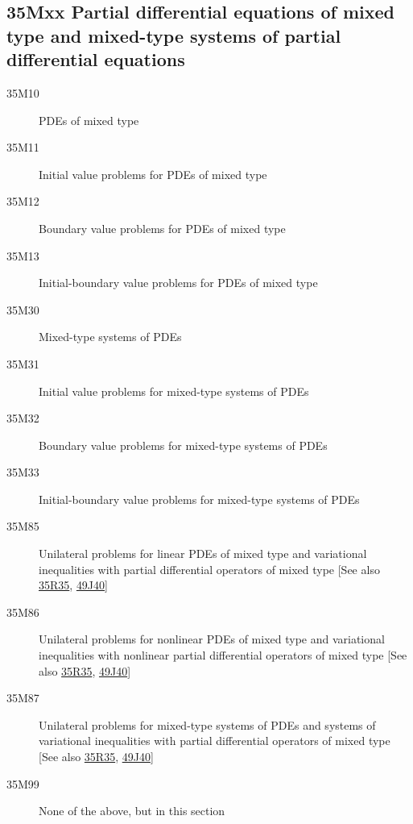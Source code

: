 \documentclass[letterpaper]{article}
\begin{document}
\subsection*{35Mxx Partial differential equations of mixed type  and mixed-type systems of partial differential equations}\label{35Mxx}
\begin{description}  
\item [35M10]\label{35M10} PDEs of mixed type
\item [35M11]\label{35M11} Initial value problems for PDEs of mixed type
\item [35M12]\label{35M12} Boundary value problems for PDEs of mixed type
\item [35M13]\label{35M13} Initial-boundary value problems for PDEs of mixed type
\item [35M30]\label{35M30} Mixed-type systems of PDEs
\item [35M31]\label{35M31} Initial value problems for mixed-type systems of PDEs
\item [35M32]\label{35M32} Boundary value problems for mixed-type systems of PDEs
\item [35M33]\label{35M33} Initial-boundary value problems for mixed-type systems of PDEs
\item [35M85]\label{35M85} Unilateral problems for linear PDEs of mixed type and variational inequalities with partial differential operators of mixed type [See also \hyperref[35R35]{35R35}, \hyperref[49J40]{49J40}]
\item [35M86]\label{35M86} Unilateral problems for nonlinear PDEs of mixed type and variational inequalities with nonlinear partial differential operators of mixed type [See also \hyperref[35R35]{35R35}, \hyperref[49J40]{49J40}]
\item [35M87]\label{35M87} Unilateral problems for mixed-type systems of PDEs and systems of  variational inequalities with partial differential operators of mixed type [See also \hyperref[35R35]{35R35}, \hyperref[49J40]{49J40}]
\item [35M99]\label{35M99} None of the above, but in this section
\end{description}
\end{document}
